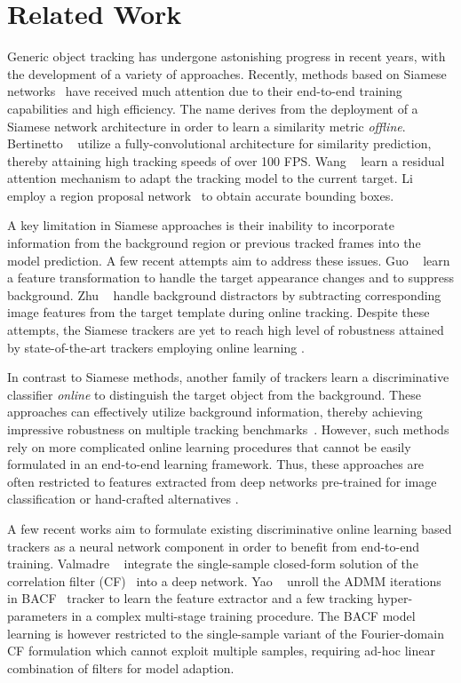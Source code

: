 \documentclass[10pt,twocolumn,letterpaper]{article}
\begin{document}
 \section{Related Work}
Generic object tracking has undergone astonishing progress in recent years, with the development of a variety of approaches. Recently, methods based on Siamese networks~\cite{SiameseFC,SiamRPN,Tao2016Sint} have received much attention due to their end-to-end training capabilities and high efficiency. The name derives from the deployment of a Siamese network architecture in order to learn a similarity metric \emph{offline}. Bertinetto \etal~\cite{SiameseFC} utilize a fully-convolutional architecture for similarity prediction, thereby attaining high tracking speeds of over 100 FPS. Wang \etal~\cite{RASNet} learn a residual attention mechanism to adapt the tracking model to the current target. Li \etal~\cite{SiamRPN} employ a region proposal network~\cite{FasterRCNN} to obtain accurate bounding boxes.

A key limitation in Siamese approaches is their inability to incorporate information from the background region or previous tracked frames into the model prediction. A few recent attempts aim to address these issues. Guo \etal~\cite{DSiam} learn a feature transformation to handle the target appearance changes and to suppress background. Zhu \etal~\cite{DaSiamRPN} handle background distractors by subtracting corresponding image features from the target template during online tracking. Despite these attempts, the Siamese trackers are yet to reach high level of robustness attained by state-of-the-art trackers employing online learning \cite{VOT2018}. 

In contrast to Siamese methods, another family of trackers \cite{ATOM,DanelljanCVPR2017,MDNet} learn a discriminative classifier \emph{online} to distinguish the target object from the background. These approaches can effectively utilize background information, thereby achieving impressive robustness on multiple tracking benchmarks~\cite{VOT2018,OTB2015}. However, such methods rely on more complicated online learning procedures that cannot be easily formulated in an end-to-end learning framework. Thus, these approaches are often restricted to features extracted from deep networks pre-trained for image classification \cite{DanelljanECCV2016,HCF_ICCV15} or hand-crafted alternatives \cite{DanelljanICCV2015}. 

A few recent works aim to formulate existing discriminative online learning based trackers as a neural network component in order to benefit from end-to-end training. Valmadre \etal~\cite{Valmadre2017cvpr} integrate the single-sample closed-form solution of the correlation filter (CF)~\cite{Henriques14} into a deep network. Yao \etal~\cite{RTINet} unroll the ADMM iterations in BACF~\cite{BACFgaloogahi} tracker to learn the feature extractor and a few tracking hyper-parameters in a complex multi-stage training procedure. The BACF model learning is however restricted to the single-sample variant of the Fourier-domain CF formulation which cannot exploit multiple samples, requiring ad-hoc linear combination of filters for model adaption. 
\end{document}
